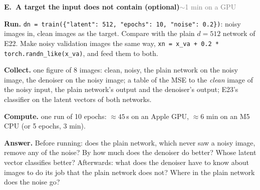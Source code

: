 \documentclass[11pt]{article}
\newcommand{\code}[1]{\texttt{#1}}
\newcounter{exp}
\newenvironment{experiment}[2]{\refstepcounter{exp}\par\medskip
  \textbf{\textcolor{aiblue}{E\theexp.\ #1}}\hfill{\small\textcolor{gray}{#2}}\par}{\par}
\newcommand{\run}[1]{\textbf{Run.} #1\par}
\newcommand{\collect}[1]{\textbf{Collect.} #1\par}
\newcommand{\answer}[1]{\textbf{Answer.} #1\par}
\newcommand{\heavy}[1]{\textcolor{gray!70!black}{\textbf{Compute.} #1}\par}
\begin{document}
\begin{experiment}{A target the input does not contain (optional)}{$\sim$1 min on a GPU}
\run{\code{dn = train(\{"latent": 512, "epochs": 10, "noise": 0.2\})}: noisy images in, clean images as the target. Compare with the plain $d=512$ network of E22. Make noisy validation images the same way, \code{xn = x\_va + 0.2 * torch.randn\_like(x\_va)}, and feed them to both.}
\collect{one figure of 8 images: clean, noisy, the plain network on the noisy image, the denoiser on the noisy image; a table of the MSE to the \emph{clean} image of the noisy input, the plain network's output and the denoiser's output; E23's classifier on the latent vectors of both networks.}
\heavy{one run of 10 epochs: $\approx45$\,s on an Apple GPU, $\approx6$ min on an M5 CPU (or 5 epochs, $3$ min).}
\answer{Before running: does the plain network, which never saw a noisy image, remove any of the noise? By how much does the denoiser do better? Whose latent vector classifies better? Afterwards: what does the denoiser have to know about images to do its job that the plain network does not? Where in the plain network does the noise go?}
\end{experiment}
\end{document}
